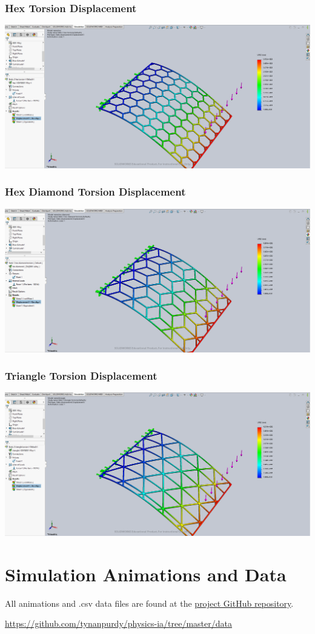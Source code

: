 \documentclass[12pt, letterpaper]{article}
\begin{document}
\begin{singlespace}
\subsubsection{Hex Torsion Displacement}
\label{ap:h-to-d}
\includegraphics[width=0.8\linewidth]{./graphs/torsion/hex-torsion-displacement}

\subsubsection{Hex Diamond Torsion Displacement}
\label{ap:hd-to-d}
\includegraphics[width=0.8\linewidth]{./graphs/torsion/hex-diamond-torsion-displacement}

\subsubsection{Triangle Torsion Displacement}
\label{ap:t-to-d}
\includegraphics[width=0.8\linewidth]{./graphs/torsion/triangle-torsion-displacement}



\section{Simulation Animations and Data}
\label{ap:data}

All animations and .csv data files are found at the \href{https://github.com/tynanpurdy/physics-ia/tree/master/data}{project GitHub repository}.

\url{https://github.com/tynanpurdy/physics-ia/tree/master/data}

\end{singlespace}
\end{document}
